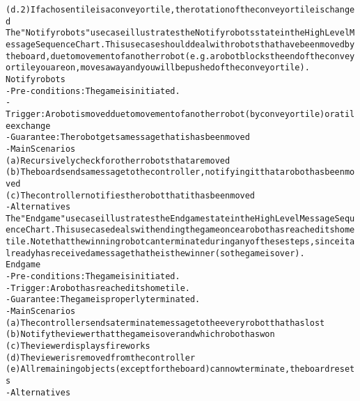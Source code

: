 \begin{alltt}
    (d.2) If a chosen tile is a conveyor tile, the rotation of the conveyor tile is changed \\

The "Notify robots" use case illustrates the Notify robots state in the High Level Message Sequence Chart. This use case should deal with robots that have been moved by the board, due to movement of another robot (e.g. a robot blocks the end of the conveyor tile you are on, moves away and you will be pushed of the conveyor tile). \\

Notify robots
- Pre-conditions: The game is initiated.
- Trigger: A robot is moved due to movement of another robot (by conveyor tile) or a tile exchange
- Guarantee: The robot gets a message that is has been moved
- Main Scenarios
    (a) Recursively check for other robots that are moved
    (b) The board sends a message to the controller, notifying it that a robot has been moved
    (c) The controller notifies the robot that it has been moved
- Alternatives \\

The "End game" use case illustrates the End game state in the High Level Message Sequence Chart. This use case deals with ending the game once a robot has reached its home tile. Note that the winning robot can terminate during any of these steps, since it already has received a message that he is the winner (so the game is over).\\

End game
- Pre-conditions: The game is initiated.
- Trigger:  A robot has reached its home tile.
- Guarantee: The game is properly terminated.
- Main Scenarios
    (a) The controller sends a terminate message to the every robot that has lost
    (b) Notify the viewer that the game is over and which robot has won
    (c) The viewer displays fireworks
    (d) The viewer is removed from the controller
    (e) All remaining objects (except for the board) can now terminate, the board resets
- Alternatives

\end{alltt}
